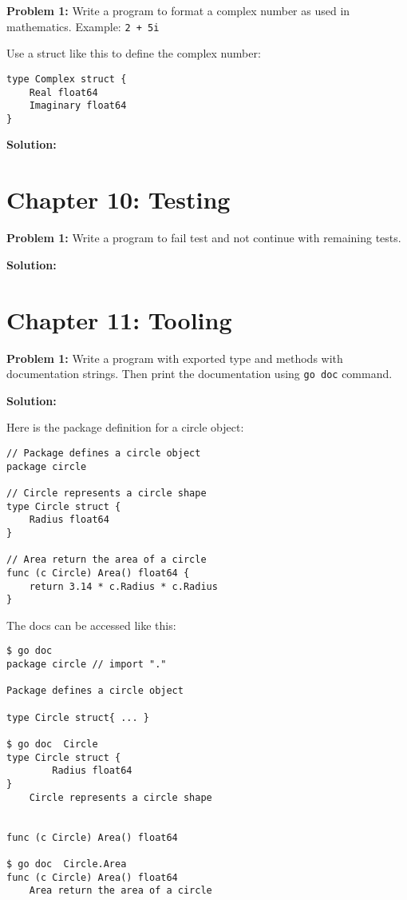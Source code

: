 \textbf{Problem 1:} Write a program to format a complex number as used in mathematics.  Example: \texttt{2 + 5i}

Use a struct like this to define the complex number:

\begin{lstlisting}[numbers=none]
type Complex struct {
    Real float64
    Imaginary float64
}
\end{lstlisting}

\textbf{Solution:}



\section*{Chapter 10: Testing}

\textbf{Problem 1:} Write a program to fail test and not continue with remaining tests.

\textbf{Solution:}



\section*{Chapter 11: Tooling}

{\bfseries Problem 1:} Write a program with exported type and methods
with documentation strings.  Then print the documentation
using \texttt{go doc} command.

\textbf{Solution:}

Here is the package definition for a circle object:

\begin{lstlisting}[numbers=none]
// Package defines a circle object
package circle

// Circle represents a circle shape
type Circle struct {
    Radius float64
}

// Area return the area of a circle
func (c Circle) Area() float64 {
    return 3.14 * c.Radius * c.Radius
}
\end{lstlisting}

The docs can be accessed like this:

\begin{lstlisting}[numbers=none]
$ go doc
package circle // import "."

Package defines a circle object

type Circle struct{ ... }

$ go doc  Circle
type Circle struct {
        Radius float64
}
    Circle represents a circle shape


func (c Circle) Area() float64

$ go doc  Circle.Area
func (c Circle) Area() float64
    Area return the area of a circle
\end{lstlisting}
